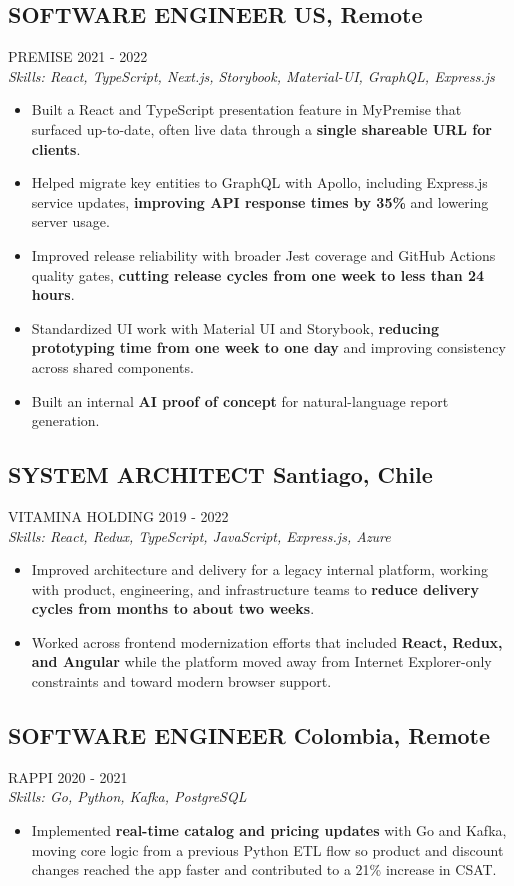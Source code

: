 \documentclass{article}
\newcommand{\WorkExperience}[2]{
   \subsection*{#1}
   \vspace{-1em}
   \uppercase{#2}
}
\newcommand{\Skills}[1]{
   \textit{Skills: #1}
}
\begin{document}
\WorkExperience{SOFTWARE ENGINEER \hfill US, Remote}{Premise \hfill 2021 {-} 2022} \\
\Skills{React, TypeScript, Next.js, Storybook, Material-UI, GraphQL, Express.js}
\begin{itemize}
	\item Built a React and TypeScript presentation feature in MyPremise that surfaced up-to-date, often live data through a \textbf{single shareable URL for clients}.
	\item Helped migrate key entities to GraphQL with Apollo, including Express.js service updates, \textbf{improving API response times by 35\%} and lowering server usage.
	\item Improved release reliability with broader Jest coverage and GitHub Actions quality gates, \textbf{cutting release cycles from one week to less than 24 hours}.
	\item Standardized UI work with Material UI and Storybook, \textbf{reducing prototyping time from one week to one day} and improving consistency across shared components.
	\item Built an internal \textbf{AI proof of concept} for natural-language report generation.
\end{itemize}

\WorkExperience{SYSTEM ARCHITECT \hfill Santiago, Chile}{Vitamina Holding \hfill 2019 {-} 2022} \\
\Skills{React, Redux, TypeScript, JavaScript, Express.js, Azure}
\begin{itemize}
	\item Improved architecture and delivery for a legacy internal platform, working with product, engineering, and infrastructure teams to \textbf{reduce delivery cycles from months to about two weeks}.
	\item Worked across frontend modernization efforts that included \textbf{React, Redux, and Angular} while the platform moved away from Internet Explorer-only constraints and toward modern browser support.
\end{itemize}

\WorkExperience{SOFTWARE ENGINEER \hfill Colombia, Remote}{Rappi \hfill 2020 {-} 2021} \\
\Skills{Go, Python, Kafka, PostgreSQL}
\begin{itemize}
	\item Implemented \textbf{real-time catalog and pricing updates} with Go and Kafka, moving core logic from a previous Python ETL flow so product and discount changes reached the app faster and contributed to a 21\% increase in CSAT.
\end{itemize}
\end{document}

